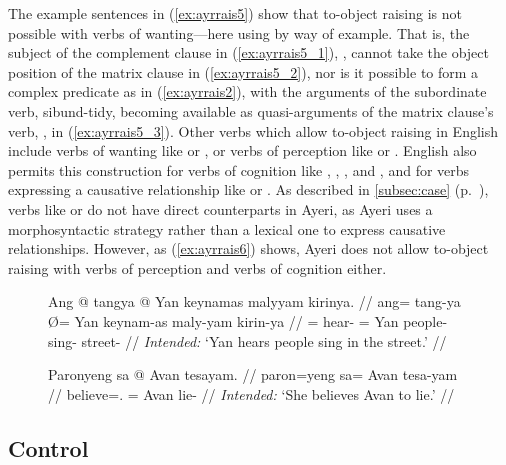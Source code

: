 The example sentences in (\ref{ex:ayrrais5}) show that to-object raising is not
possible with verbs of wanting---here using  by way
of example. That is, the subject of the complement clause in
(\ref{ex:ayrrais5_1}), , cannot take the object position of
the matrix clause in (\ref{ex:ayrrais5_2}), nor is it possible to form a
complex predicate as in (\ref{ex:ayrrais2}), with the arguments of the
subordinate verb,  {sibund-}{tidy}, becoming available as
quasi-arguments of the matrix clause's verb, , in
(\ref{ex:ayrrais5_3}). Other verbs which allow to-object raising in English
include verbs of wanting like  or , or verbs of perception
like  or . English also permits this construction for verbs of
cognition like , , , and , and for
verbs expressing a causative relationship like  or . As
described in \autoref{subsec:case} (p.~\pageref{subsubsec:causative}), verbs
like  or  do not have direct counterparts in Ayeri, as Ayeri
uses a morphosyntactic strategy rather than a lexical one to express causative
relationships. However, as (\ref{ex:ayrrais6}) shows, Ayeri does not allow
to-object raising with verbs of perception and verbs of cognition either.

\begin{figure}
\pex\label{ex:ayrrais6}
\a\label{ex:ayrrais6_1}\ljudge*\begingl
	\gla Ang @ tangya {} @ Yan keynamas malyyam kirinya. //
	\glb ang= tang-ya Ø= Yan keynam-as maly-yam kirin-ya //
	\glc \Aarg{}= hear-\TsgM{} \Top{}= Yan people-\Parg{} sing-\Ptcp{}
		street-\Loc {} //
	\glft \textit{Intended:} `Yan hears people sing in the street.' //
\endgl

\a\label{ex:ayrrais6_2}\ljudge*\begingl
	\gla Paronyeng sa @ Avan tesayam. //
	\glb paron=yeng sa= Avan tesa-yam //
	\glc believe=\TsgF{}.\Aarg{} \Parg{}= Avan lie-\Ptcp{} //
	\glft \textit{Intended:} `She believes Avan to lie.' //
\endgl
\xe
\end{figure}


\subsection{Control}
\label{subsec:control}

